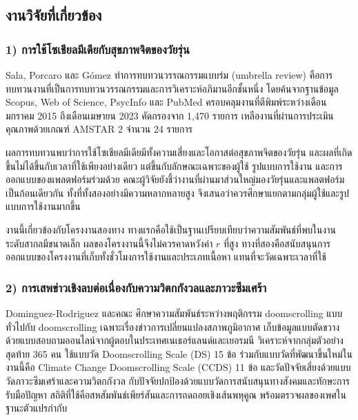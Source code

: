 \subsection{งานวิจัยที่เกี่ยวข้อง}

\subsubsection*{1) การใช้โซเชียลมีเดียกับสุขภาพจิตของวัยรุ่น}

Sala, Porcaro และ Gómez \cite{sala2024umbrella} ทำการทบทวนวรรณกรรมแบบร่ม (umbrella review)
คือการทบทวนงานที่เป็นการทบทวนวรรณกรรมและการวิเคราะห์อภิมานอีกชั้นหนึ่ง
โดยค้นจากฐานข้อมูล Scopus, Web of Science, PsycInfo และ PubMed
ครอบคลุมงานที่ตีพิมพ์ระหว่างเดือนมกราคม 2015 ถึงเดือนเมษายน 2023
คัดกรองจาก 1,470 รายการ เหลืองานที่ผ่านการประเมินคุณภาพด้วยเกณฑ์ AMSTAR 2 จำนวน 24 รายการ

ผลการทบทวนพบว่าการใช้โซเชียลมีเดียมีทั้งความเสี่ยงและโอกาสต่อสุขภาพจิตของวัยรุ่น
และผลที่เกิดขึ้นไม่ได้ขึ้นกับเวลาที่ใช้เพียงอย่างเดียว
แต่ขึ้นกับลักษณะเฉพาะของผู้ใช้ รูปแบบการใช้งาน และการออกแบบของแพลตฟอร์มร่วมด้วย
คณะผู้วิจัยยังชี้ว่างานที่ผ่านมาส่วนใหญ่มองวัยรุ่นและแพลตฟอร์มเป็นก้อนเดียวกัน
ทั้งที่ทั้งสองอย่างมีความหลากหลายสูง จึงเสนอว่าควรศึกษาแยกตามกลุ่มผู้ใช้และรูปแบบการใช้งานมากขึ้น

งานนี้เกี่ยวข้องกับโครงงานสองทาง ทางแรกคือใช้เป็นฐานเปรียบเทียบว่าความสัมพันธ์ที่พบในงานระดับสากลมีขนาดเล็ก
ผลของโครงงานนี้จึงไม่ควรคาดหวังค่า $r$ ที่สูง
ทางที่สองคือสนับสนุนการออกแบบของโครงงานที่เก็บทั้งชั่วโมงการใช้งานและประเภทเนื้อหา
แทนที่จะวัดเฉพาะเวลาที่ใช้

\subsubsection*{2) การเสพข่าวเชิงลบต่อเนื่องกับความวิตกกังวลและภาวะซึมเศร้า}

Dominguez-Rodriguez และคณะ \cite{dominguez2025climate} ศึกษาความสัมพันธ์ระหว่างพฤติกรรม doomscrolling
แบบทั่วไปกับ doomscrolling เฉพาะเรื่องข่าวการเปลี่ยนแปลงสภาพภูมิอากาศ
เก็บข้อมูลแบบตัดขวางด้วยแบบสอบถามออนไลน์จากผู้ตอบในประเทศเนเธอร์แลนด์และเยอรมนี
วิเคราะห์จากกลุ่มตัวอย่างสุดท้าย 365 คน
ใช้แบบวัด Doomscrolling Scale (DS) 15 ข้อ ร่วมกับแบบวัดที่พัฒนาขึ้นใหม่ในงานนี้คือ
Climate Change Doomscrolling Scale (CCDS) 11 ข้อ
และวัดปัจจัยเสี่ยงด้วยแบบวัดภาวะซึมเศร้าและความวิตกกังวล
กับปัจจัยปกป้องด้วยแบบวัดการสนับสนุนทางสังคมและทักษะการรับมือปัญหา
สถิติที่ใช้คือสหสัมพันธ์เพียร์สันและการถดถอยเชิงเส้นพหุคูณ พร้อมตรวจผลของเพศในฐานะตัวแปรกำกับ


